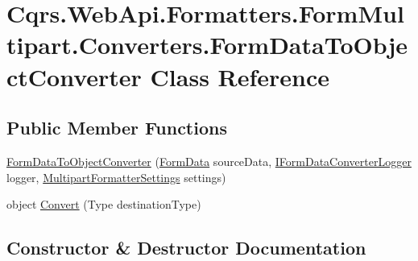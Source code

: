 \hypertarget{classCqrs_1_1WebApi_1_1Formatters_1_1FormMultipart_1_1Converters_1_1FormDataToObjectConverter}{}\section{Cqrs.\+Web\+Api.\+Formatters.\+Form\+Multipart.\+Converters.\+Form\+Data\+To\+Object\+Converter Class Reference}
\label{classCqrs_1_1WebApi_1_1Formatters_1_1FormMultipart_1_1Converters_1_1FormDataToObjectConverter}
\subsection*{Public Member Functions}
\begin{DoxyCompactItemize}
\item 
\hyperlink{classCqrs_1_1WebApi_1_1Formatters_1_1FormMultipart_1_1Converters_1_1FormDataToObjectConverter_aa0552b59a58759bf2691a074c897393d}{Form\+Data\+To\+Object\+Converter} (\hyperlink{classCqrs_1_1WebApi_1_1Formatters_1_1FormMultipart_1_1Infrastructure_1_1FormData}{Form\+Data} source\+Data, \hyperlink{interfaceCqrs_1_1WebApi_1_1Formatters_1_1FormMultipart_1_1Infrastructure_1_1Logger_1_1IFormDataConverterLogger}{I\+Form\+Data\+Converter\+Logger} logger, \hyperlink{classCqrs_1_1WebApi_1_1Formatters_1_1FormMultipart_1_1Infrastructure_1_1MultipartFormatterSettings}{Multipart\+Formatter\+Settings} settings)
\item 
object \hyperlink{classCqrs_1_1WebApi_1_1Formatters_1_1FormMultipart_1_1Converters_1_1FormDataToObjectConverter_a1b3d45a20f48b1608a6a68796610c5aa}{Convert} (Type destination\+Type)
\end{DoxyCompactItemize}


\subsection{Constructor \& Destructor Documentation}
\mbox{\label{classCqrs_1_1WebApi_1_1Formatters_1_1FormMultipart_1_1Converters_1_1FormDataToObjectConverter_aa0552b59a58759bf2691a074c897393d}} 

